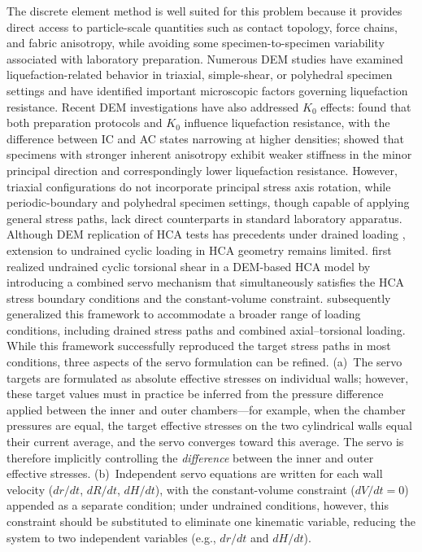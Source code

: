 \documentclass[a4paper,fleqn]{cas-sc}
\newcommand{\Kzero}{\ensuremath{K_0}}
\begin{document}
The discrete element method \citep[DEM;][]{Cundall1979} is well suited for this problem because it provides direct access to particle-scale quantities such as contact topology, force chains, and fabric anisotropy, while avoiding some specimen-to-specimen variability associated with laboratory preparation. Numerous DEM studies have examined liquefaction-related behavior in triaxial, simple-shear, or polyhedral specimen settings \citep[e.g.,][]{Huang2018,Yang2021,Jiang2021,Morimoto2021,WuYang2022,Xie2023,YangHuang2023,Zhang2023} and have identified important microscopic factors governing liquefaction resistance. Recent DEM investigations have also addressed \Kzero{} effects: \citet{YangTaiebat2024} found that both preparation protocols and \Kzero{} influence liquefaction resistance, with the difference between IC and AC states narrowing at higher densities; \citet{Otsubo2022} showed that specimens with stronger inherent anisotropy exhibit weaker stiffness in the minor principal direction and correspondingly lower liquefaction resistance. However, triaxial configurations do not incorporate principal stress axis rotation, while periodic-boundary and polyhedral specimen settings, though capable of applying general stress paths, lack direct counterparts in standard laboratory apparatus. Although DEM replication of HCA tests has precedents under drained loading \citep[e.g.,][]{Li2014,Liu2021}, extension to undrained cyclic loading in HCA geometry remains limited. \citet{Han2024jgs} first realized undrained cyclic torsional shear in a DEM-based HCA model by introducing a combined servo mechanism that simultaneously satisfies the HCA stress boundary conditions and the constant-volume constraint. \citet{Ma2024} subsequently generalized this framework to accommodate a broader range of loading conditions, including drained stress paths and combined axial--torsional loading. While this framework successfully reproduced the target stress paths in most conditions, three aspects of the servo formulation can be refined.
(a)~The servo targets are formulated as absolute effective stresses on individual walls; however, these target values must in practice be inferred from the pressure difference applied between the inner and outer chambers---for example, when the chamber pressures are equal, the target effective stresses on the two cylindrical walls equal their current average, and the servo converges toward this average. The servo is therefore implicitly controlling the \emph{difference} between the inner and outer effective stresses.
(b)~Independent servo equations are written for each wall velocity ($dr/dt$, $dR/dt$, $dH/dt$), with the constant-volume constraint ($dV/dt=0$) appended as a separate condition; under undrained conditions, however, this constraint should be substituted to eliminate one kinematic variable, reducing the system to two independent variables (e.g., $dr/dt$ and $dH/dt$).
\end{document}
